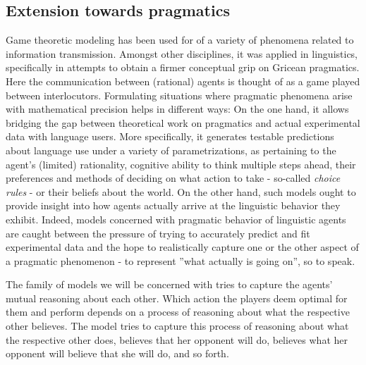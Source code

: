 \documentclass[10]{article}
\begin{document}
\subsection{Extension towards pragmatics}
Game theoretic modeling has been used for of a variety of phenomena related to information transmission. %
Amongst other disciplines, it was applied in linguistics, specifically in attempts to obtain a firmer conceptual grip on Gricean pragmatics. Here the communication between (rational) agents is thought of as a game played between interlocutors. Formulating situations where pragmatic phenomena arise with mathematical precision helps in different ways: On the one hand, it allows bridging the gap between theoretical work on pragmatics and actual experimental data with language users. More specifically, it generates testable predictions about language use under a variety of parametrizations, as pertaining to the agent's (limited) rationality, cognitive ability to think multiple steps ahead, their preferences and methods of deciding on what action to take - so-called \textit{choice rules} %
 - or their beliefs about the world. On the other hand, such models ought to provide insight into how agents actually arrive at the linguistic behavior they exhibit. %
 Indeed, models concerned with pragmatic behavior of linguistic agents are caught between the pressure of trying to accurately predict and fit experimental data and the hope to realistically capture one or the other aspect of a pragmatic phenomenon - to represent ''what actually is going on'', so to speak.

The family of models we will be concerned with tries to capture the agents' mutual reasoning about each other. Which action the players deem optimal for them and perform depends on a process of reasoning about what the respective other believes. The model tries to capture this process of reasoning about what the respective other does, believes that her opponent will do, believes what her opponent will believe that she will do, and so forth. %
\end{document}
